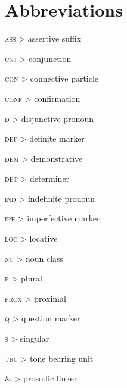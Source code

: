 \documentclass[output=paper]{langsci/langscibook}
\begin{document}
\section*{Abbreviations}

\textsc{ass} > assertive suffix

\textsc{cnj} > conjunction

\textsc{con} > connective particle

\textsc{conf} > confirmation

\textsc{d} > disjunctive pronoun

\textsc{def} > definite marker

\textsc{dem} > demonstrative

\textsc{det} > determiner

\textsc{ind} > indefinite pronoun

\textsc{ipf} > imperfective marker

\textsc{loc} > locative

\textsc{nc} > noun class

\textsc{p} > plural

\textsc{prox} > proximal

\textsc{q} > question marker

\textsc{s} > singular

\textsc{tbu} > tone bearing unit

\& > prosodic linker

 

\printbibliography[heading=subbibliography,notkeyword=this]
\end{document}
